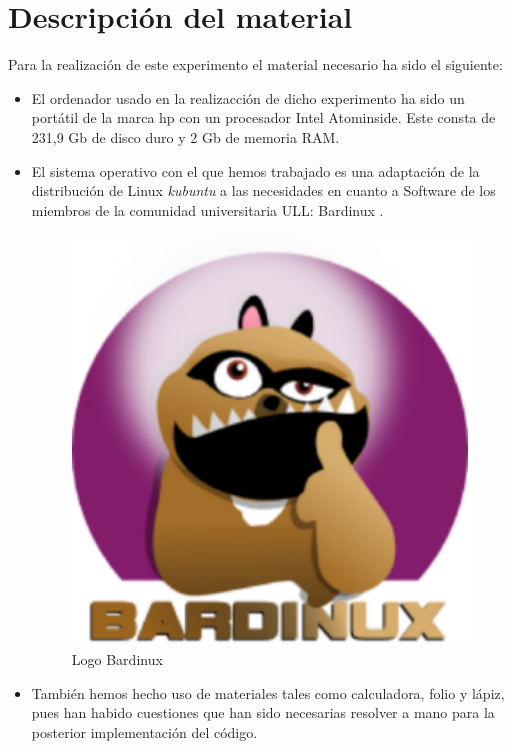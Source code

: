 \section{Descripción del material}
\label{3:sec:2}
    Para la realización de este experimento el material necesario ha sido el siguiente:
 \begin{itemize}
  \item El ordenador usado en la realizacción de dicho experimento ha sido un portátil de la marca hp con un procesador Intel Atom{\tiny inside}. Este consta de 231,9 Gb de disco duro y 2 Gb de memoria RAM.
  \item El sistema operativo con el que hemos trabajado es una adaptación de la distribución de Linux \textit{kubuntu} a las necesidades en cuanto a Software de los miembros de la comunidad universitaria ULL: Bardinux \cite{url:bardinux}. 
 
  \begin{figure}
  \begin{center}
  \includegraphics[scale=0.15]{images/bardinux.eps}
  \end{center}
  \caption{Logo Bardinux}
  \label{graph:1}
  \end{figure}
  \item También hemos hecho uso de materiales tales como calculadora, folio y lápiz, pues han habido cuestiones que han sido necesarias resolver a mano para la posterior implementación del código.
 \end{itemize}
 

